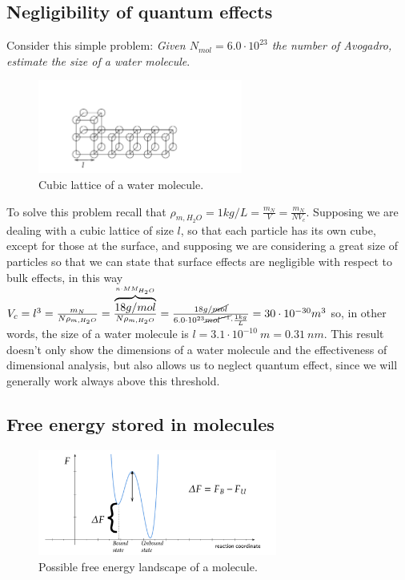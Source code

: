 \documentclass[../main/main.tex]{subfiles}
\begin{document}
\subsection{Negligibility of quantum effects}
Consider this simple problem: \emph{Given $N_{mol} = 6.0\cdot10^{23}$ the number of Avogadro, estimate the size of a water molecule}. 

\begin{figure}
    \centering
    \includegraphics[width=0.6\textwidth]{../frontespizio/tikz/1_lesson/exercise.pdf}
    \caption{\label{fig:water} Cubic lattice of a water molecule.}
\end{figure}

To solve this problem recall that $\rho_{m, H_2O}=1kg/L = \frac{m_N}{V}=\frac{m_N}{NV_c}$. Supposing we are dealing with a cubic lattice of size $l$, so that each particle has its own cube, except for those at the surface, and supposing we are considering a great size of particles so that we can state that surface effects are negligible with respect to bulk effects, in this way $V_c = l^3=\frac{m_N}{N\rho_{m, H_2 O}}=\frac{\overbrace{18g/mol}^{n\cdot MM_{H_2 O}}}{N\rho_{m,H_2 O}}=\frac{18g/\cancel{mol}}{6.0\cdot10^{23}\cancel{mol^{-1}}\cdot\frac{1kg}{L}}=30\cdot10^{-30}m^3$ so, in other words, the size of a water molecule is $l=3.1\cdot 10^{-10}\:m=0.31\:nm$. 
This result doesn't only show the dimensions of a water molecule and the effectiveness of dimensional analysis, but also allows us to neglect quantum effect, since we will generally work always above this threshold.
\subsection{Free energy stored in molecules}
\begin{figure}[h!]
    \centering
    \includegraphics[width=0.7\textwidth]{../frontespizio/tikz/1_lesson/free_energy.pdf}
    \caption{Possible free energy landscape of a molecule.}
\end{figure}
\end{document}
